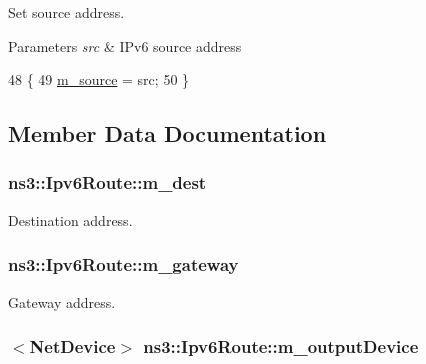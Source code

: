 Set source address. 


\begin{DoxyParams}{Parameters}
{\em src} & I\+Pv6 source address \\
\hline
\end{DoxyParams}

\begin{DoxyCode}
48 \{
49   \hyperlink{classns3_1_1Ipv6Route_a8b3683bd8c4337630df3a83c18a9fa38}{m\_source} = src;
50 \}
\end{DoxyCode}


\subsection{Member Data Documentation}
\subsubsection[{\texorpdfstring{m\+\_\+dest}{m_dest}}]{ ns3\+::\+Ipv6\+Route\+::m\+\_\+dest\hspace{0.3cm}{\ttfamily [private]}}\hypertarget{classns3_1_1Ipv6Route_a8b876e17fd74146673d776bf9bc29a2a}{}\label{classns3_1_1Ipv6Route_a8b876e17fd74146673d776bf9bc29a2a}


Destination address. 

\subsubsection[{\texorpdfstring{m\+\_\+gateway}{m_gateway}}]{ ns3\+::\+Ipv6\+Route\+::m\+\_\+gateway\hspace{0.3cm}{\ttfamily [private]}}\hypertarget{classns3_1_1Ipv6Route_aacbb70b8aa3ad323f8b5acd7f4148c89}{}\label{classns3_1_1Ipv6Route_aacbb70b8aa3ad323f8b5acd7f4148c89}


Gateway address. 

\subsubsection[{\texorpdfstring{m\+\_\+output\+Device}{m_outputDevice}}]{$<${\bf Net\+Device}$>$ ns3\+::\+Ipv6\+Route\+::m\+\_\+output\+Device\hspace{0.3cm}{\ttfamily [private]}}\hypertarget{classns3_1_1Ipv6Route_a7f0350e3877dbb3cd9bf7d628296c945}{}\label{classns3_1_1Ipv6Route_a7f0350e3877dbb3cd9bf7d628296c945}


